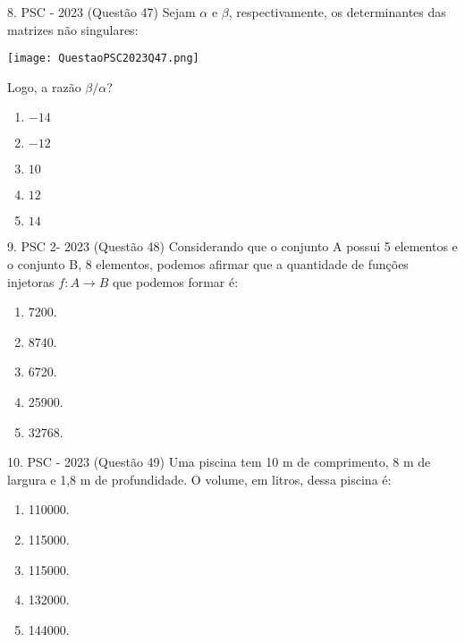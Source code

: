 \documentclass[aspectratio=169]{beamer}
\newif\ifusarcorvermelha
\newcommand{\vermelho}[1]{%
    \ifusarcorvermelha
        {\color{red}#1}%
    \else
        #1%
    \fi
}
\begin{document}
    \begin{frame}{8. PSC  - 2023 (Questão 47)}
      Sejam $\alpha$ e $\beta$, respectivamente, os determinantes das matrizes não singulares:

      \begin{center}
          \texttt{[image: QuestaoPSC2023Q47.png]}
      \end{center} Logo, a razão ${\beta}/{\alpha}$?
      
         \begin{enumerate}[a]
                    \item $-14$
                    \item \vermelho{$-12$} %
                    \item $10$
                    \item $12$
                    \item $14$
                \end{enumerate}        
    \end{frame}

     \begin{frame}{9. PSC 2- 2023 (Questão 48)}
        Considerando que o conjunto A possui 5 elementos e o conjunto B, 8 elementos, podemos afirmar que a quantidade de funções injetoras $f:A \to B$ que podemos formar é:

         \begin{enumerate}[a]
                    \item 7200.
                    \item 8740.
                    \item \vermelho{6720.} %
                    \item 25900.
                    \item 32768.
                \end{enumerate}        
    \end{frame}

     \begin{frame}{10. PSC  - 2023 (Questão 49)}
        Uma piscina tem 10 m de comprimento, 8 m de largura e 1,8 m de profundidade. O volume, em litros, dessa piscina é:

         \begin{enumerate}[a]
                    \item 110000.
                    \item 115000.
                    \item 115000.
                    \item 132000.
                    \item \vermelho{144000.} %
                \end{enumerate}        
    \end{frame}
\end{document}
